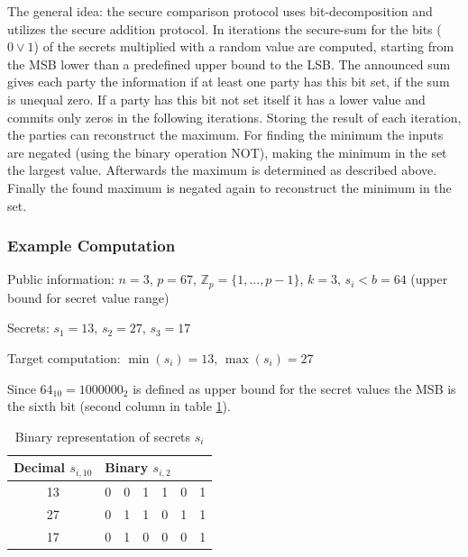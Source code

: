 		The general idea: the secure comparison protocol uses bit-decomposition and utilizes the secure addition protocol. In iterations the secure-sum for the bits ($0 \lor 1$) of the secrets multiplied with a random value are computed, starting from the \gls{MSB} lower than a predefined upper bound to the \gls{LSB}. The announced sum gives each party the information if at least one party has this bit set, if the sum is unequal zero. If a party has this bit not set itself it has a lower value and commits only zeros in the following iterations. Storing the result of each iteration, the parties can reconstruct the maximum.
		For finding the minimum the inputs are negated (using the binary operation NOT), making the minimum in the set the largest value. Afterwards the maximum is determined as described above. Finally the found maximum is negated again to reconstruct the minimum in the set.
		
		\subsubsection{Example Computation}
		\label{Secure Comparison Example}
		
		Public information: $n=3$, $p=67$, $\mathbb{Z}_p=\{1,...,p-1\}$, $k=3$, $s_i<b=64$ (upper bound for secret value range) \par
		\noindent Secrets: $s_1=13$, $s_2=27$, $s_3=17$ \par
		
		\noindent Target computation: $\min(s_i)=13$, $\max(s_i)=27$
		
		Since $64_{10}=1000000_2$ is defined as upper bound for the secret values the \gls{MSB} is the sixth bit (second column in table \ref{table:secure maximum binary representation of secrets}).
		 
		\begin{table}[!htb]
			\centering
			\caption{Binary representation of secrets $s_i$}
			\label{table:secure maximum binary representation of secrets}
			\begin{tabular}{|c|l|l|l|l|l|l|}
				\hline
				Decimal $s_{i,10}$ & \multicolumn{6}{l|}{Binary $s_{i,2}$} \\ \hline
				13                 & 0    & 0    & 1    & 1    & 0   & 1   \\ \hline
				27                 & 0    & 1    & 1    & 0    & 1   & 1   \\ \hline
				17                 & 0    & 1    & 0    & 0    & 0   & 1   \\ \hline
			\end{tabular}
		\end{table}

